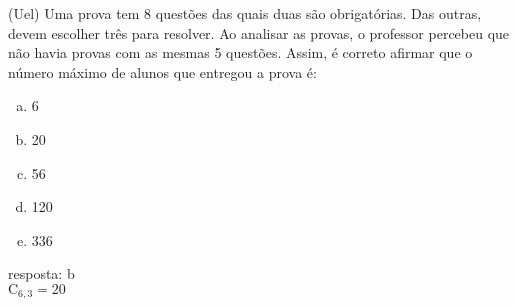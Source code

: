 \begin{ex}
(Uel) Uma prova tem 8 questões das quais duas são obrigatórias. Das outras, devem escolher três para resolver. Ao analisar as provas, o professor percebeu que não havia provas com as mesmas 5 questões. Assim, é correto afirmar que o número máximo de alunos que entregou a prova é:
   \begin{enumerate}[(a)]
   \item 6
   \item 20
   \item 56
   \item 120
   \item 336
   \end{enumerate}
    \begin{sol}
     resposta: b \\
     $\mathrm{C}_{6,3}=20$
    \end{sol}
\end{ex}